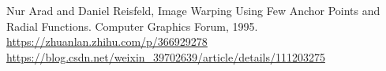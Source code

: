 \documentclass[12pt]{article}
\begin{document}
\begin{thebibliography}{3}
     Nur Arad and Daniel Reisfeld, Image Warping Using Few Anchor Points and Radial Functions. Computer Graphics Forum, 1995.
     \url{https://zhuanlan.zhihu.com/p/366929278}
     \url{https://blog.csdn.net/weixin_39702639/article/details/111203275}

\end{thebibliography}
\end{document}
